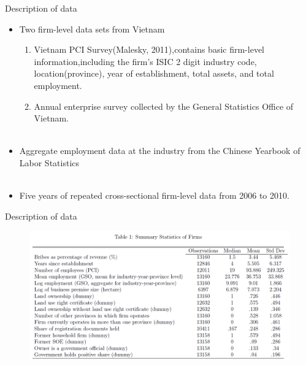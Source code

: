 \documentclass{beamer}
\begin{document}
\begin{frame}{Description of data}
\begin{itemize}
\item Two firm-level data sets from Vietnam 
\begin{enumerate}
\item Vietnam PCI Survey(Malesky, 2011),contains basic firm-level information,including the firm's ISIC 2 digit industry code, location(province), year of establishment, total assets, and total employment.
\item Annual enterprise survey collected by the General Statistics Office of Vietnam. \\~
\end{enumerate}

\item Aggregate employment data at the industry from the Chinese Yearbook of Labor Statistics \\~

\item Five years of repeated cross-sectional firm-level data from 2006 to 2010.

\end{itemize}

\end{frame}

\begin{frame}{Description of data}

\begin{figure}
\centering
\includegraphics[width=1\linewidth]{5.png}
\end{figure}

\end{frame}
\end{document}
